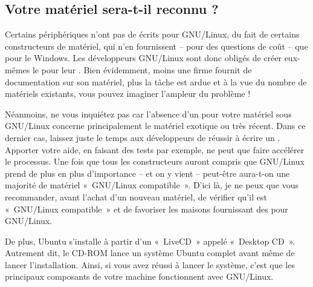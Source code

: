 \subsection{Votre matériel sera-t-il reconnu ?}
Certains périphériques n'ont pas de  écrits pour GNU/Linux, du fait de certains constructeurs de matériel, qui n'en fournissent -- pour des questions de coût -- que pour le  Windows. Les développeurs GNU/Linux sont donc obligés de créer eux-mêmes le  pour leur . Bien évidemment, moins une firme fournit de documentation sur son matériel, plus la tâche est ardue et à la vue du nombre de matériels existants, vous pouvez imaginer l'ampleur du problème !\par
Néanmoins, ne vous inquiétez pas car l'absence d'un  pour votre matériel sous GNU/Linux concerne principalement le matériel exotique ou très récent. Dans ce dernier cas, laissez juste le temps aux développeurs de réussir à écrire un . Apporter votre aide, en faisant des tests par exemple, ne peut que faire accélérer le processus. Une fois que tous les constructeurs auront compris que GNU/Linux prend de plus en plus d'importance -- et on y vient -- peut-être aura-t-on une majorité de matériel «~GNU/Linux compatible~». D'ici là, je ne peux que vous recommander, avant l'achat d'un nouveau matériel, de vérifier qu'il est «~GNU/Linux compatible~» et de favoriser les maisons fournissant des  pour GNU/Linux.\par
De plus, Ubuntu s'installe à partir d'un «~LiveCD~» appelé «~Desktop CD~». Autrement dit, le CD-ROM lance un système Ubuntu complet avant même de lancer l'installation. Ainsi, si vous avez réussi à lancer le système, c'est que les principaux composants de votre machine fonctionnent avec GNU/Linux.
